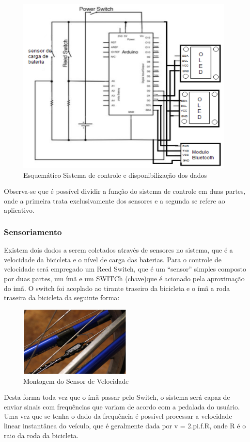			\graphicspath{{figuras/}}
			\begin{figure}[h!]
				\centering
				\includegraphics[scale=1.4]{Figura_7_sistema_de_controle.PNG}
				\caption{Esquemático Sistema de controle e disponibilização dos dados}
				\label{img:sistema_de_controle_e_disponibiização_de_dados}
			\end{figure}
			
		Observa-se que é possível dividir a função do sistema de controle em duas partes, onde a primeira trata exclusivamente dos sensores e a segunda se refere ao aplicativo.
	
		\subsubsection{Sensoriamento}
		Existem dois dados a serem coletados através de sensores no sistema, que é a velocidade da bicicleta e o nível de carga das baterias.
		Para o controle de velocidade será empregado um Reed Switch, que é um “sensor” simples composto por duas partes, um ímã e um SWITCh (chave)que é acionado pela aproximação do imã. O switch foi acoplado ao tirante traseiro da bicicleta e o ímã a roda traseira da bicicleta da seguinte forma:
			\graphicspath{{figuras/}}
			\begin{figure}[h!]
				\centering
				\includegraphics[width=0.5\textwidth]{Figura_8_montagem_do_sensor_velocidade.PNG}
				\caption{Montagem do Sensor de Velocidade}
				\label{img:montagem_do_sensor_velocidade}
			\end{figure}
		Desta forma toda vez que o ímã passar pelo Switch, o sistema será capaz de enviar sinais com frequências que variam de acordo com a pedalada do usuário. Uma vez que se tenha o dado da frequência é possível processar a velocidade linear instantânea do veículo, que é geralmente dada por v = 2.pi.f.R, onde R é o raio da roda da bicicleta.
		
